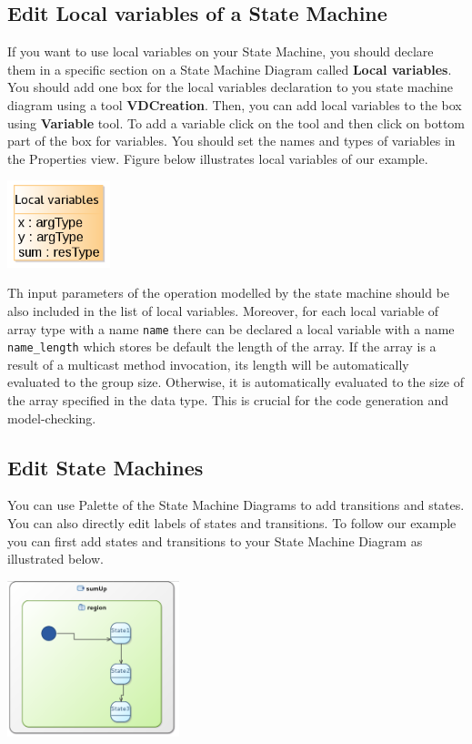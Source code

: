 \documentclass[12pt]{article}
\begin{document}
\subsection{Edit Local variables of a State Machine }
If you want to use local variables on your State Machine, you should declare them in a specific section on a State Machine Diagram called \textbf{Local variables}. You should add one box for the local variables declaration to you state machine diagram using a tool \textbf{VDCreation}. Then, you can add local variables to the box using \textbf{Variable} tool. To add a variable click on the tool and then click on bottom part of the box for variables. You should set the names and types of variables in the Properties view. Figure below illustrates local variables of our example.

     \centerline{
     \includegraphics[width=3cm]{draws/loc-var.png}
     \label{fig:vce-proj}
     }
 
 Th input parameters of the operation modelled by the state machine should be also included in the list of local variables. Moreover, for each local variable of array type with a name \texttt{name} there can be declared a local variable with a name \texttt{name\_length} which stores be default the length of the array. If the array is a result of a multicast method invocation, its length will be automatically evaluated to the group size. Otherwise, it is automatically evaluated to the size of the array specified in the data type. This is crucial for the code generation and model-checking.
 
\subsection{Edit State Machines}
You can use Palette of the State Machine Diagrams to add transitions and states. You can also directly edit labels of states and transitions. To follow our example you can first add states and transitions to your State Machine Diagram as illustrated below.

     \centerline{
     \includegraphics[width=5cm]{draws/sm-no-lbl.png}
     \label{fig:vce-proj}
     }
     
\end{document}
